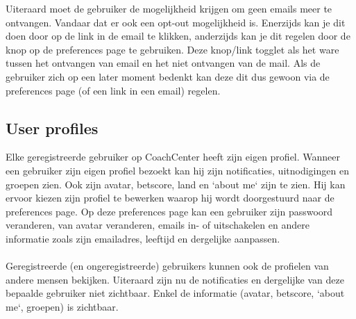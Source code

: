 \documentclass[11pt, a4paper]{article}
\begin{document}
Uiteraard moet de gebruiker de mogelijkheid krijgen om geen emails meer te ontvangen. Vandaar dat er ook een opt-out mogelijkheid is. Enerzijds kan je dit doen door op de link in de email te klikken,
anderzijds kan je dit regelen door de knop op de preferences page te gebruiken. Deze knop/link togglet als het ware tussen het ontvangen van email en het niet ontvangen van de mail. Als de gebruiker zich op een later moment
bedenkt kan deze dit dus gewoon via de preferences page (of een link in een email) regelen.

\subsection{User profiles}
Elke geregistreerde gebruiker op CoachCenter heeft zijn eigen profiel. Wanneer een gebruiker zijn eigen profiel bezoekt kan hij zijn notificaties, uitnodigingen en groepen zien.
Ook zijn avatar, betscore, land en `about me` zijn te zien. Hij kan ervoor kiezen zijn profiel te bewerken waarop hij wordt doorgestuurd naar de preferences page.
Op deze preferences page kan een gebruiker zijn passwoord veranderen, van avatar veranderen, emails in- of uitschakelen en andere informatie zoals zijn emailadres, leeftijd en dergelijke aanpassen.
\\
\\
Geregistreerde (en ongeregistreerde) gebruikers kunnen ook de profielen van andere mensen bekijken. Uiteraard zijn nu de notificaties en dergelijke van deze bepaalde gebruiker niet zichtbaar.
Enkel de informatie (avatar, betscore, `about me`, groepen) is zichtbaar.
\end{document}
